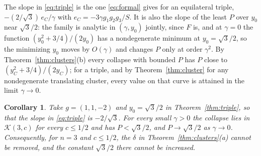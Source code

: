 \documentclass[11pt]{article}
\newtheorem{corollary}{Corollary}
\theoremstyle{definition}
\newcommand{\K}{\mathcal{K}}
\begin{document}
The slope in \eqref{eq:triple} is the one \eqref{eq:formal} gives for an equilateral triple, $-(2/\sqrt{3})\,e_C/\gamma$ with $e_C = -3\gamma g_1g_2g_3/S$. It is also the slope of the least $P$ over $y_0$ near $\sqrt{3}/2$: the family is analytic in $(\gamma, y_0)$ jointly, since $F$ is, and at $\gamma = 0$ the function $(y_0^2 + 3/4)/(2y_0)$ has a nondegenerate minimum at $y_0 = \sqrt{3}/2$, so the minimizing $y_0$ moves by $O(\gamma)$ and changes $P$ only at order $\gamma^2$. By Theorem~\ref{thm:clusters}(b) every collapse with bounded $P$ has $P$ close to $(y_C^2 + 3/4)/(2y_C)$; for a triple, and by Theorem~\ref{thm:cluster} for any nondegenerate translating cluster, every value on that curve is attained in the limit $\gamma \to 0$.

\begin{corollary}\label{cor:triple}
Take $g = (1, 1, -2)$ and $y_0 = \sqrt{3}/2$ in Theorem~\ref{thm:triple}, so that the slope in \eqref{eq:triple} is $-2/\sqrt{3}$. For every small $\gamma > 0$ the collapse lies in $\K(3, c)$ for every $c \le 1/2$ and has $P < \sqrt{3}/2$, and $P \to \sqrt{3}/2$ as $\gamma \to 0$. Consequently, for $n = 3$ and $c \le 1/2$, the $\delta$ in Theorem~\ref{thm:clusters}(a) cannot be removed, and the constant $\sqrt{3}/2$ there cannot be increased.
\end{corollary}
\end{document}
